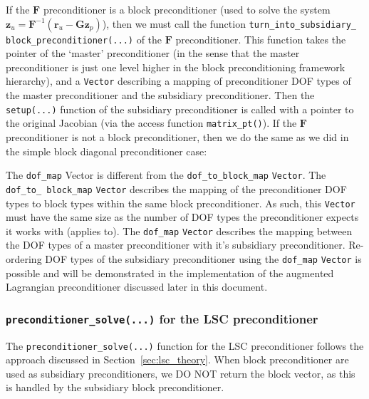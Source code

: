 If the $\mathbf{F}$ preconditioner is a block preconditioner (used to solve the
system $\mathbf{z}_u = \mathbf{F}^{-1} \left( \mathbf{r}_u - \mathbf{G}
  \mathbf{z}_p \right)$), then we must call the function
\texttt{turn\_\allowbreak into\_\allowbreak subsidiary\_\allowbreak
  block\_\allowbreak preconditioner(...)} of the $\mathbf{F}$ preconditioner.
This function takes the pointer of the `master' preconditioner (in the sense
that the master preconditioner is just one level higher in the block
preconditioning framework hierarchy), and a \texttt{Vector} describing a
mapping of preconditioner DOF types of the master preconditioner and the
subsidiary preconditioner. Then the \texttt{setup(...)} function of the
subsidiary preconditioner is called with a pointer to the original Jacobian
(via the access function \texttt{matrix\_\allowbreak pt()}). If the
$\mathbf{F}$ preconditioner is not a block preconditioner, then we do the same
as we did in the simple block diagonal preconditioner case:

The \texttt{dof\_\allowbreak map} Vector is different from the
\texttt{dof\_\allowbreak to\_\allowbreak block\_\allowbreak map}
\texttt{Vector}.  The \texttt{dof\_\allowbreak to\_\allowbreak
  block\_\allowbreak map} \texttt{Vector} describes the mapping of the
preconditioner DOF types to block types within the same block preconditioner.
As such, this \texttt{Vector} must have the same size as the number of DOF
types the preconditioner expects it works with (applies to). The
\texttt{dof\_\allowbreak map} \texttt{Vector} describes the mapping between the
DOF types of a master preconditioner with it's subsidiary preconditioner.
Re-ordering DOF types of the subsidiary preconditioner using the
\texttt{dof\_\allowbreak map} \texttt{Vector} is possible and will be
demonstrated in the implementation of the augmented Lagrangian preconditioner
discussed later in this document.


\subsubsection{\texttt{preconditioner\_solve(...)} for the LSC preconditioner\label{sec:lsc_implementation_precsolve}}
The \texttt{preconditioner\_\allowbreak solve(...)} function for the LSC
preconditioner follows the approach discussed in Section~\ref{sec:lsc_theory}.
When block preconditioner are used as subsidiary preconditioners, we DO NOT
return the block vector, as this is handled by the subsidiary block
preconditioner.



